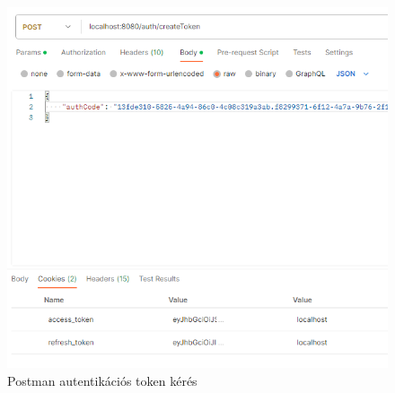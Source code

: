 \documentclass[a4paper,twoside]{article}
\begin{document}
\begin{figure}
	\caption{Postman autentikációs token kérés}
	\label{fig:postman}
	\centering
	\includegraphics[scale=0.5]{getTokens}
\end{figure}
\end{document}

